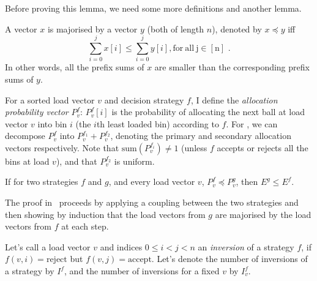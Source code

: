 Before proving this lemma, we need some more definitions and another lemma.


\begin{definition} [majorisation]
A vector $x$ is majorised by a vector $y$ (both of length $n$), denoted by $x \preccurlyeq y$ iff $$\sum_{i=0}^j x[i] \leq \sum_{i=0}^j y[i]\mathrm{, for\ all\ j\in [n]} \text{ .}$$In other words, all the prefix sums of $x$ are smaller than the corresponding prefix sums of $y$.
\end{definition}


\begin{definition} 
For a sorted load vector $v$ and decision strategy $f$, I define the \textit{allocation probability vector} $P^f_v$: $P^f_v[i]$ is the probability of allocating the next ball at load vector $v$ into bin $i$ (the $i$th least loaded bin) according to $f$. For \TwoThinning, we can decompose $P^f_v$ into $P^{f_1}_{v}+P^{f_2}_{v}$, denoting the primary and secondary allocation vectors respectively. Note that $\mathrm{sum}(P^{f_i}_{v})\neq 1$ (unless $f$ accepts or rejects all the bins at load $v$), and that $P^{f_2}_{v}$ is uniform.
\end{definition}


\begin{lemma}  \label{lemma: majorisation-implies-better}
If for two strategies $f$ and $g$, and every load vector $v$, $P^f_v\preccurlyeq P^g_v$, then $E^g\leq E^f$.
\end{lemma}

\begin{remark}
The proof in~\cite{azar1999twochoice} proceeds by applying a coupling between the two strategies and then showing by induction that the load vectors from $g$ are majorised by the load vectors from $f$ at each step.
\end{remark}


\begin{definition} 
Let's call a load vector $v$ and indices $0\leq i<j<n$ an \textit{inversion} of a strategy $f$, if $f(v,i)=\mathrm{reject}$ but $f(v,j)=\mathrm{accept}$. Let's denote the number of inversions of a strategy by $I^f$, and the number of inversions for a fixed $v$ by $I^f_v$.
\end{definition}


